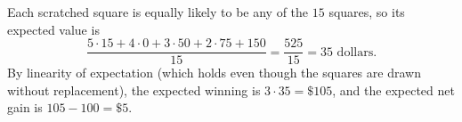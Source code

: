 Each scratched square is equally likely to be any of the $15$ squares, so its expected value is
\[\dfrac{5\cdot15+4\cdot0+3\cdot50+2\cdot75+150}{15}=\dfrac{525}{15}=35\text{ dollars}.\]
By linearity of expectation (which holds even though the squares are drawn without replacement), the expected winning is $3\cdot35=\boxed{\$105}$, and the expected net gain is $105-100=\boxed{\$5}$.
